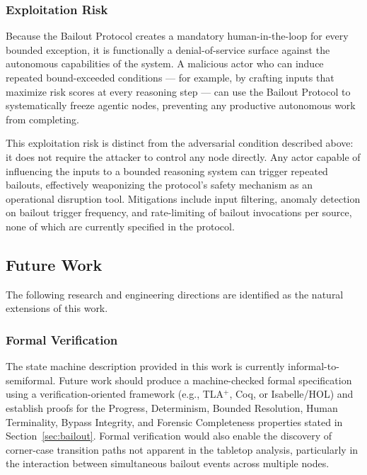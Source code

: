 \subsubsection{Exploitation Risk}
\label{sec:lim_exploitation}

Because the Bailout Protocol creates a mandatory human-in-the-loop for every bounded exception, it is functionally a denial-of-service surface against the autonomous capabilities of the system. A malicious actor who can induce repeated bound-exceeded conditions — for example, by crafting inputs that maximize risk scores at every reasoning step — can use the Bailout Protocol to systematically freeze agentic nodes, preventing any productive autonomous work from completing.

This exploitation risk is distinct from the adversarial condition described above: it does not require the attacker to control any node directly. Any actor capable of influencing the inputs to a bounded reasoning system can trigger repeated bailouts, effectively weaponizing the protocol's safety mechanism as an operational disruption tool. Mitigations include input filtering, anomaly detection on bailout trigger frequency, and rate-limiting of bailout invocations per source, none of which are currently specified in the protocol.

\subsection{Future Work}
\label{sec:future}

The following research and engineering directions are identified as the natural extensions of this work.

\subsubsection{Formal Verification}
\label{sec:fw_formal_verification}

The state machine description provided in this work is currently informal-to-semiformal. Future work should produce a machine-checked formal specification using a verification-oriented framework (e.g., TLA$^+$, Coq, or Isabelle/HOL) and establish proofs for the Progress, Determinism, Bounded Resolution, Human Terminality, Bypass Integrity, and Forensic Completeness properties stated in Section~\ref{sec:bailout}. Formal verification would also enable the discovery of corner-case transition paths not apparent in the tabletop analysis, particularly in the interaction between simultaneous bailout events across multiple nodes.

